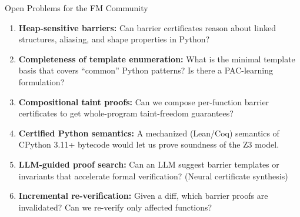 \documentclass[aspectratio=169]{beamer}
\begin{document}
\begin{frame}{Open Problems for the FM Community}

\begin{enumerate}
  \item \textbf{Heap-sensitive barriers:} Can barrier certificates reason about linked structures, aliasing, and shape properties in Python?

  \item \textbf{Completeness of template enumeration:} What is the minimal template basis that covers ``common'' Python patterns? Is there a PAC-learning formulation?

  \item \textbf{Compositional taint proofs:} Can we compose per-function barrier certificates to get whole-program taint-freedom guarantees?

  \item \textbf{Certified Python semantics:} A mechanized (Lean/Coq) semantics of CPython 3.11+ bytecode would let us prove soundness of the Z3 model.

  \item \textbf{LLM-guided proof search:} Can an LLM suggest barrier templates or invariants that accelerate formal verification? (Neural certificate synthesis)

  \item \textbf{Incremental re-verification:} Given a diff, which barrier proofs are invalidated? Can we re-verify only affected functions?
\end{enumerate}

\end{frame}
\end{document}
